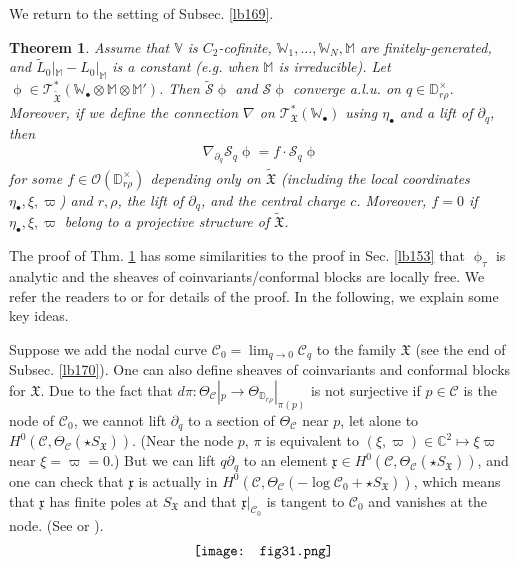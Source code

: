 \documentclass[11pt,b5paper,notitlepage]{article}
\theoremstyle{definition}
\theoremstyle{plain}
\newtheorem{thm}[df]{Theorem}
\newcommand{\fk}{\mathfrak}
\newcommand{\mc}{\mathcal}
\newcommand{\wtd}{\widetilde}
\newcommand{\scr}{\mathscr}
\newcommand{\xk}{\mathfrak x}
\newcommand{\SX}{{S_{\fk X}}}
\newcommand{\blt}{\bullet}
\newcommand{\Vbb}{\mathbb V}
\newcommand{\Wbb}{\mathbb W}
\newcommand{\Mbb}{\mathbb M}
\newcommand{\Cbb}{\mathbb C}
\newcommand{\Dbb}{\mathbb D}
\numberwithin{equation}{section}
\begin{document}
We return to the setting of Subsec. \ref{lb169}.
\begin{thm}\label{lb171}
Assume that $\Vbb$ is $C_2$-cofinite,  $\Wbb_1,\dots,\Wbb_N,\Mbb$ are finitely-generated, and $\wtd L_0|_\Mbb-L_0|_\Mbb$ is a constant (e.g. when $\Mbb$ is irreducible). Let $\upphi\in\scr T^*_{\wtd{\fk X}}(\Wbb_\blt\otimes\Mbb\otimes\Mbb')$. Then $\wtd{\mc S}\upphi$ and $\mc S\upphi$ converge a.l.u. on $q\in\Dbb_{r\rho}^\times$. Moreover, if we define the connection $\nabla$ on $\scr T_{\fk X}^*(\Wbb_\blt)$ using $\eta_\blt$ and a lift of $\partial_q$, then
\begin{align}
\nabla_{\partial_q}\mc S_q\upphi=f\cdot\mc S_q\upphi
\end{align}
for some $f\in\scr O(\Dbb_{r\rho}^\times)$ depending only on $\wtd{\fk X}$ (including the local coordinates $\eta_\blt,\xi,\varpi$) and $r,\rho$, the lift of $\partial_q$, and the central charge $c$. Moreover, $f=0$  if $\eta_\blt,\xi,\varpi$ belong to a projective structure of $\wtd{\fk X}$.
\end{thm}

The proof of Thm. \ref{lb171} has some similarities to the proof in Sec. \ref{lb153} that  $\upphi_\tau$ is analytic and the sheaves of coinvariants/conformal blocks are locally free. We refer the readers to \cite[Sec. 4.3]{Gui} or \cite[Sec. 11]{Gui20} for details of the proof. In the following, we explain some key ideas.

Suppose we add the nodal curve $\mc C_0=\lim_{q\rightarrow 0}\mc C_q$ to the family $\fk X$ (see the end of Subsec. \ref{lb170}). One can also define sheaves of coinvariants and conformal blocks for $\fk X$. Due to the fact that $d\pi:\Theta_{\mc C}|_p\rightarrow \Theta_{\Dbb_{r\rho}}|_{\pi(p)}$ is not surjective if $p\in\mc C$ is the node of $\mc C_0$, we cannot lift $\partial_q$ to a section of $\Theta_{\mc C}$ near $p$, let alone to  $H^0(\mc C,\Theta_{\mc C}(\star\SX))$. (Near the node $p$, $\pi$ is equivalent to $(\xi,\varpi)\in\Cbb^2\mapsto \xi\varpi$ near $\xi=\varpi=0$.) But we can lift $q\partial_q$ to an element $\xk\in H^0(\mc C,\Theta_{\mc C}(\star\SX))$, and one can check that $\xk$ is actually in $ H^0(\mc C,\Theta_{\mc C}(-\log\mc C_0+\star\SX))$, which means that $\xk$ has finite poles at $\SX$ and that $\xk|_{\mc C_0}$ is tangent to $\mc C_0$ and vanishes at the node. (See \cite[Sec. 3.6]{Gui} or \cite[Sec. 11]{Gui20}). 
\begin{align}
\vcenter{\hbox{{
\texttt{[image: fig31.png]}}}}
\end{align}
\end{document}
